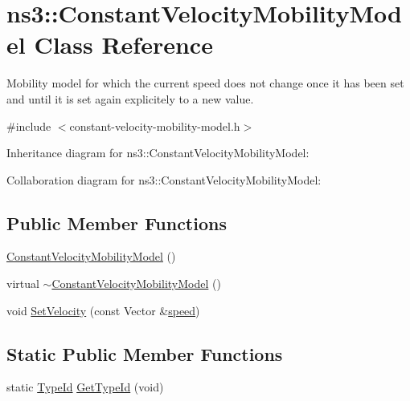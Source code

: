 \hypertarget{classns3_1_1ConstantVelocityMobilityModel}{}\section{ns3\+:\+:Constant\+Velocity\+Mobility\+Model Class Reference}
\label{classns3_1_1ConstantVelocityMobilityModel}


Mobility model for which the current speed does not change once it has been set and until it is set again explicitely to a new value.  




{\ttfamily \#include $<$constant-\/velocity-\/mobility-\/model.\+h$>$}



Inheritance diagram for ns3\+:\+:Constant\+Velocity\+Mobility\+Model\+:


Collaboration diagram for ns3\+:\+:Constant\+Velocity\+Mobility\+Model\+:
\subsection*{Public Member Functions}
\begin{DoxyCompactItemize}
\item 
\hyperlink{classns3_1_1ConstantVelocityMobilityModel_a321104f05277a530518426fe9258ea31}{Constant\+Velocity\+Mobility\+Model} ()
\item 
virtual \hyperlink{classns3_1_1ConstantVelocityMobilityModel_a5b5ff0df4d2ceacc3842b52b93fe5d08}{$\sim$\+Constant\+Velocity\+Mobility\+Model} ()
\item 
void \hyperlink{classns3_1_1ConstantVelocityMobilityModel_a8754fbb7b1722d0454f28cd1a30afc27}{Set\+Velocity} (const Vector \&\hyperlink{mmwave-amc-test_8cc_a6dc6e6f3c75c509ce943163afb5dade7}{speed})
\end{DoxyCompactItemize}
\subsection*{Static Public Member Functions}
\begin{DoxyCompactItemize}
\item 
static \hyperlink{classns3_1_1TypeId}{Type\+Id} \hyperlink{classns3_1_1ConstantVelocityMobilityModel_abcc9cf118448563d1a8a50b6e0e65e4d}{Get\+Type\+Id} (void)
\end{DoxyCompactItemize}
